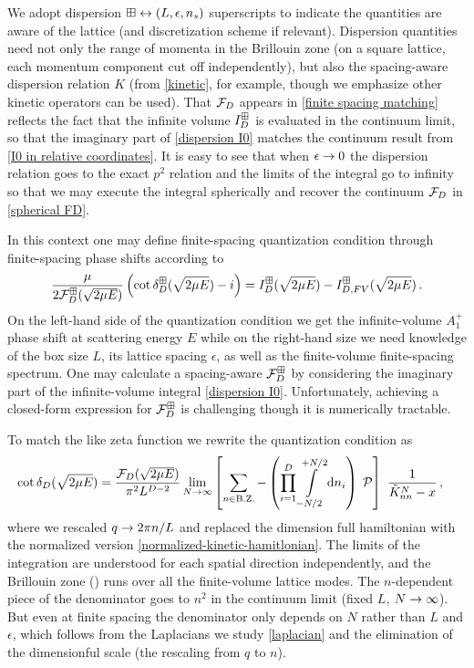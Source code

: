 We adopt dispersion $\boxplus \leftrightarrow (L, \epsilon, {n_s})$ superscripts to indicate the quantities are aware of the lattice (and discretization scheme if relevant).
Dispersion quantities need not only the range of momenta in the Brillouin zone (on a square lattice, each momentum component cut off independently), but also the spacing-aware dispersion relation $K$ (from \eqref{kinetic}, for example, though we emphasize other kinetic operators can be used).
That $\mathcal{F}_D$ appears in \eqref{finite spacing matching} reflects the fact that the infinite volume $I_D^{\boxplus}$ is evaluated in the continuum limit, so that the imaginary part of \eqref{dispersion I0} matches the continuum result from \eqref{I0 in relative coordinates}.
It is easy to see that when $\epsilon\rightarrow0$ the dispersion relation goes to the exact $p^2$ relation and the limits of the integral go to infinity so that we may execute the integral spherically and recover the continuum $\mathcal{F}_D$ in \eqref{spherical FD}.

In this context one may define finite-spacing quantization condition through finite-spacing phase shifts according to
\begin{equation}
    \frac{\mu}{2 \mathcal{F}_D^\boxplus(\sqrt{2\mu E})}\left(\cot\delta_D^\boxplus(\sqrt{2\mu E})-i\right)
    =
    I_D^{\boxplus}(\sqrt{2\mu E}) - I_{D,FV}^{\boxplus}(\sqrt{2\mu E})
	\, .
\end{equation}
On the left-hand side of the quantization condition we get the infinite-volume $A_1^+$ phase shift at scattering energy $E$ while on the right-hand size we need knowledge of the box size $L$, its lattice spacing $\epsilon$, as well as the finite-volume finite-spacing spectrum.
One may calculate a spacing-aware $\mathcal{F}_D^\boxplus$ by considering the imaginary part of the infinite-volume integral \eqref{dispersion I0}.
Unfortunately, achieving a closed-form expression for $\mathcal{F}_D^\boxplus$ is challenging though it is numerically tractable.

To match the \Luscher like zeta function we rewrite the quantization condition as
\begin{align}
    \cot \delta_D(\sqrt{2 \mu E})
    &=
    \frac{\mathcal{F}_D(\sqrt{2 \mu E})}{\pi^2 L^{D-2}}
    \lim_{N\rightarrow\infty}
    \left[
    	\sum_{n\in\text{B.Z.}} -
		\left(\prod_{i=1}^D
    		\int\limits_{-N/2}^{+N/2}
    		\mathrm{d} n_i
    	\right)\; \mathcal{P}
	\right]\  \frac{1}{\tilde K_{nn}^{N}-x}
	\, ,
\end{align}
where we rescaled $q\rightarrow 2\pi n/L$ and replaced the dimension full hamiltonian with the normalized version \eqref{normalized-kinetic-hamitlonian}.
The limits of the integration are understood for each spatial direction independently, and the Brillouin zone (\BZ) runs over all the finite-volume lattice modes.
The $n$-dependent piece of the denominator goes to $n^2$ in the continuum limit (fixed $L$, $N\rightarrow\infty$). 
But even at finite spacing the denominator only depends on $N$ rather than $L$ and $\epsilon$, which follows from the Laplacians we study \eqref{laplacian} and the elimination of the dimensionful scale (the rescaling from $q$ to $n$).

